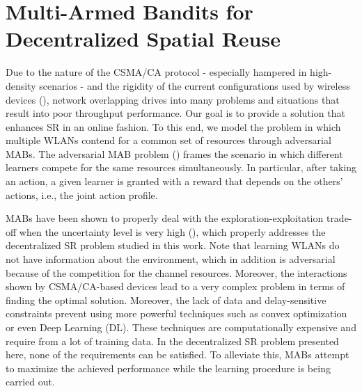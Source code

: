 \documentclass{article}
\begin{document}
\section{Multi-Armed Bandits for Decentralized Spatial Reuse}
\label{section:mabs}
Due to the nature of the CSMA/CA protocol - especially hampered in high-density scenarios - and the rigidity of the current configurations used by wireless devices (\citealp{akella2007self}), network overlapping drives into many problems and situations that result into poor throughput performance. Our goal is to provide a solution that enhances SR in an online fashion. To this end, we model the problem in which multiple WLANs contend for a common set of resources through adversarial MABs. The adversarial MAB problem (\citealp{auer1995gambling}) frames the scenario in which different learners compete for the same resources simultaneously. In particular, after taking an action, a given learner is granted with a reward that depends on the others' actions, i.e., the joint action profile. 

MABs have been shown to properly deal with the exploration-exploitation trade-off when the uncertainty level is very high (\citealp{auer2002finite, audibert2009exploration, scott2010modern}), which properly addresses the decentralized SR problem studied in this work. Note that learning WLANs do not have information about the environment, which in addition is adversarial because of the competition for the channel resources. Moreover, the interactions shown by CSMA/CA-based devices lead to a very complex problem in terms of finding the optimal solution. Moreover, the lack of data and delay-sensitive constraints prevent using more powerful techniques such as convex optimization or even Deep Learning (DL). These techniques are computationally expensive and require from a lot of training data. In the decentralized SR problem presented here, none of the requirements can be satisfied. To alleviate this, MABs attempt to maximize the achieved performance while the learning procedure is being carried out.
\end{document}

